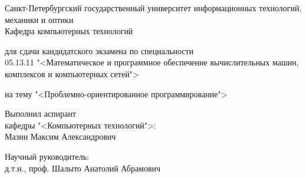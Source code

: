 \thispagestyle{empty}
\thispagestyle{fancy}
\fancyhf{}

\begin{center}
Санкт-Петербургский государственный университет информационных технологий, механики и оптики\\
Кафедра компьютерных технологий

\vspace*{3cm plus 3cm minus 3cm}
{}

для сдачи кандидатского экзамена по специальности\\
05.13.11 "<Математическое и программное обеспечение вычислительных машин, комплексов и компьютерных сетей">

\vspace{2cm plus 2cm minus 2cm}
на тему "<Проблемно-ориентированное программирование">
\end{center}
\vspace{4cm}

\begin{flushright}
Выполнил аспирант\\
кафедры "<Компьютерных технологий">:\\
Мазин Максим Александрович
\vspace{2cm}

Научный руководитель:\\
д.т.н., проф. Шалыто Анатолий Абрамович\\
\end{flushright}

\renewcommand{\headrulewidth}{0pt}
\newpage
